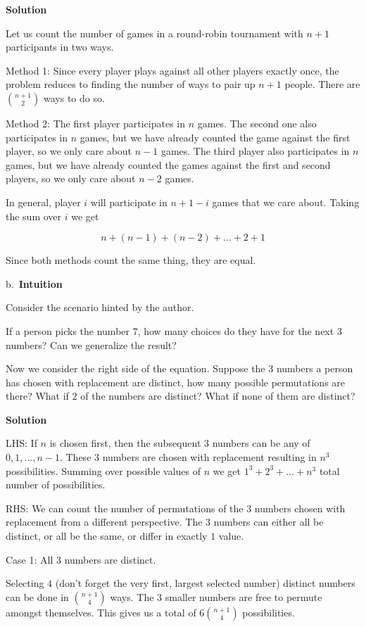 \documentclass[]{book}
\begin{document}
 \textbf{Solution}

Let us count the number of games in a round-robin tournament with
\(n+1\) participants in two ways.

Method 1: Since every player plays against all other players exactly
once, the problem reduces to finding the number of ways to pair up
\(n+1\) people. There are \({n+1 \choose 2}\) ways to do so.

Method 2: The first player participates in \(n\) games. The second one
also participates in \(n\) games, but we have already counted the game
against the first player, so we only care about \(n-1\) games. The third
player also participates in \(n\) games, but we have already counted the
games against the first and second players, so we only care about
\(n-2\) games.

In general, player \(i\) will participate in \(n+1-i\) games that we
care about. Taking the sum over \(i\) we get

\[n + (n-1) + (n-2) + \dots + 2 + 1\]

Since both methods count the same thing, they are equal.

b.~\textbf{Intuition}

Consider the scenario hinted by the author.

If a person picks the number \(7\), how many choices do they have for
the next \(3\) numbers? Can we generalize the result?

Now we consider the right side of the equation. Suppose the \(3\)
numbers a person has chosen with replacement are distinct, how many
possible permutations are there? What if \(2\) of the numbers are
distinct? What if none of them are distinct?

 \textbf{Solution}

LHS: If \(n\) is chosen first, then the subsequent \(3\) numbers can be
any of \(0, 1, \dots, n-1\). These \(3\) numbers are chosen with
replacement resulting in \(n^{3}\) possibilities. Summing over possible
values of \(n\) we get \(1^{3} + 2^{3} + \dots + n^{3}\) total number of
possibilities.

RHS: We can count the number of permutations of the \(3\) numbers chosen
with replacement from a different perspective. The \(3\) numbers can
either all be distinct, or all be the same, or differ in exactly \(1\)
value.

Case 1: All \(3\) numbers are distinct.

Selecting \(4\) (don't forget the very first, largest selected number)
distinct numbers can be done in \({n+1 \choose 4}\) ways. The \(3\)
smaller numbers are free to permute amongst themselves. This gives us a
total of \(6{n+1 \choose 4}\) possibilities.
\end{document}
